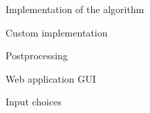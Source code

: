 \documentclass[9pt]{extarticle}
\begin{document}
\begin{section}{Implementation of the algorithm}
\begin{subsection}{Custom implementation}
            \begin{subsubsection}{Postprocessing}
                \label{subsec:postprocessing}

            \end{subsubsection}
        \end{subsection}

        \begin{subsection}{Web application GUI}
            

            \begin{subsubsection}{Input choices}
                

\end{subsubsection}
\end{subsection}
\end{section}
\end{document}
